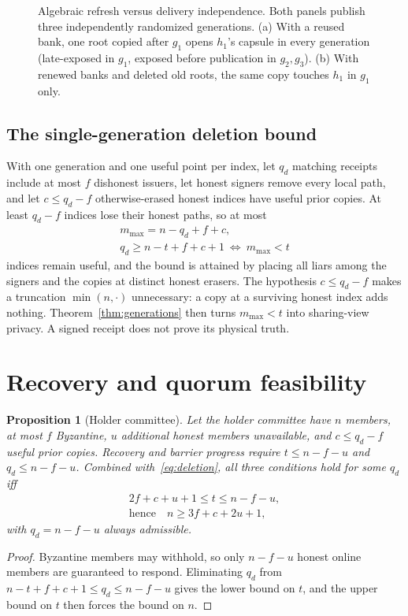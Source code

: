\documentclass[pdflatex,sn-mathphys-num]{sn-jnl}%
\theoremstyle{plain}
\newtheorem{proposition}[theorem]{Proposition}
\theoremstyle{definition}
\begin{document}
\begin{figure}[t]
\centering
\figbox{}
\caption{Algebraic refresh versus delivery independence. Both panels publish three independently randomized generations. (a) With a reused bank, one root copied after $g_1$ opens $h_1$'s capsule in every generation (late-exposed in $g_1$, exposed before publication in $g_2,g_3$). (b) With renewed banks and deleted old roots, the same copy touches $h_1$ in $g_1$ only.}\label{fig:reuse}
\end{figure}

\subsection{The single-generation deletion bound}
With one generation and one useful point per index, let $q_d$ matching receipts include at most $f$ dishonest issuers, let honest signers remove every local path, and let $c\le q_d-f$ otherwise-erased honest indices have useful prior copies. At least $q_d-f$ indices lose their honest paths, so at most
\begin{equation}\label{eq:deletion}
\begin{gathered}
 m_{\max}=n-q_d+f+c,\\
 q_d\ge n-t+f+c+1\ \Longleftrightarrow\ m_{\max}<t
\end{gathered}
\end{equation}
indices remain useful, and the bound is attained by placing all liars among the signers and the copies at distinct honest erasers. The hypothesis $c\le q_d-f$ makes a truncation $\min(n,\cdot)$ unnecessary: a copy at a surviving honest index adds nothing. Theorem~\ref{thm:generations} then turns $m_{\max}<t$ into sharing-view privacy. A signed receipt does not prove its physical truth.


\section{Recovery and quorum feasibility}\label{sec:quorum}

\begin{proposition}[Holder committee]\label{prop:holders}
Let the holder committee have $n$ members, at most $f$ Byzantine, $u$ additional honest members unavailable, and $c\le q_d-f$ useful prior copies. Recovery and barrier progress require $t\le n-f-u$ and $q_d\le n-f-u$. Combined with~\eqref{eq:deletion}, all three conditions hold for some $q_d$ iff
\begin{equation}\label{eq:feasible}
\begin{gathered}
 2f+c+u+1\le t\le n-f-u,\\
 \text{hence}\quad n\ge3f+c+2u+1,
\end{gathered}
\end{equation}
with $q_d=n-f-u$ always admissible.
\end{proposition}
\begin{proof}
Byzantine members may withhold, so only $n-f-u$ honest online members are guaranteed to respond. Eliminating $q_d$ from $n-t+f+c+1\le q_d\le n-f-u$ gives the lower bound on $t$, and the upper bound on $t$ then forces the bound on $n$.
\end{proof}
\end{document}
